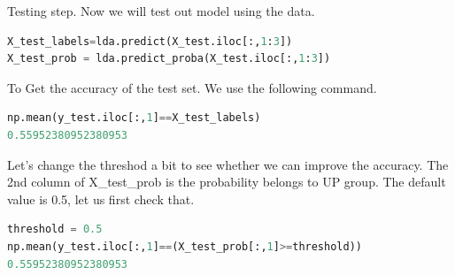 Testing step. Now we will test out model using the data.
\begin{lstlisting}[language=Python]
X_test_labels=lda.predict(X_test.iloc[:,1:3])
X_test_prob = lda.predict_proba(X_test.iloc[:,1:3])
\end{lstlisting}

To Get the accuracy of the test set. We use the following command.

\begin{lstlisting}[language=Python]
np.mean(y_test.iloc[:,1]==X_test_labels)
0.55952380952380953
\end{lstlisting}

Let's change the threshod a bit to see whether we can improve the accuracy. The 2nd column of X\_test\_prob is the probability belongs to UP group. The default value is 0.5, let us first check that.

\begin{lstlisting}[language=Python]
threshold = 0.5 
np.mean(y_test.iloc[:,1]==(X_test_prob[:,1]>=threshold))
0.55952380952380953
\end{lstlisting}

